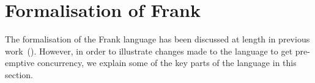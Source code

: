 \documentclass[msc,deptreport,cs]{infthesis} %
\begin{document}
\chapter{Formalisation of Frank}
\label{chap:formalisation}


The formalisation of the Frank language has been discussed at length in previous
work~(\cite{convent2020doo}). However, in order to illustrate changes made to
the language to get pre-emptive concurrency, we explain some of the key parts of
the language in this section.
\end{document}
